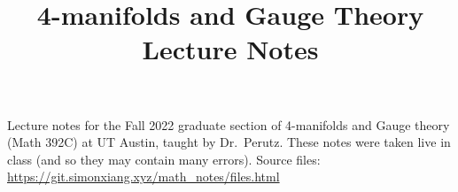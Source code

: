 \documentclass[fontsize=9pt]{article}
\title{4-manifolds and Gauge Theory Lecture Notes}
\date{}
\begin{document}
\maketitle
Lecture notes for the Fall 2022 graduate section of 4-manifolds and Gauge theory (Math 392C) at UT Austin, taught by Dr.\ Perutz. These notes were taken live in class (and so they may contain many errors). Source files: \url{https://git.simonxiang.xyz/math_notes/files.html}

\tableofcontents
\newpage
    
    
    
    
    
    
    
    
    
    
    
    
    
\end{document}
